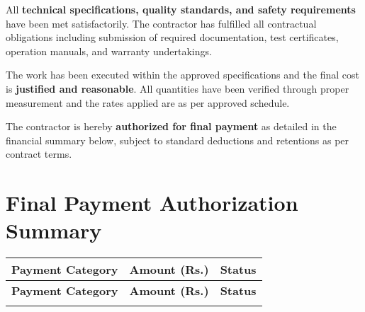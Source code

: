 \documentclass[12pt,a4paper]{article}
\begin{document}
\begin{center}
{\begin{minipage}{0.95\textwidth}
All \textbf{technical specifications, quality standards, and safety requirements} have been met satisfactorily. The contractor has fulfilled all contractual obligations including submission of required documentation, test certificates, operation manuals, and warranty undertakings.

\vspace{0.5cm}

The work has been executed within the approved specifications and the final cost is \textbf{justified and reasonable}. All quantities have been verified through proper measurement and the rates applied are as per approved schedule.

\vspace{0.5cm}

The contractor is hereby \textbf{authorized for final payment} as detailed in the financial summary below, subject to standard deductions and retentions as per contract terms.

\vspace{1cm}
\section*{Final Payment Authorization Summary}

\begin{center}
\begin{longtable}{|p{8cm}|p{3cm}|p{2.5cm}|}
\hline
\rowcolor{finalgreen!20}
\textbf{Payment Category} & \textbf{Amount (Rs.)} & \textbf{Status} \\
\hline
\endfirsthead

\hline
\rowcolor{finalgreen!20}
\textbf{Payment Category} & \textbf{Amount (Rs.)} & \textbf{Status} \\
\hline
\endhead

\hline
\endfoot

\hline
\endlastfoot


\end{longtable}
\end{center}
\end{minipage}}
\end{center}
\end{document}
